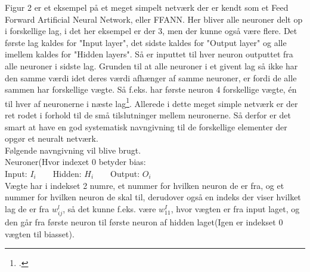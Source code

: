 Figur 2 er et eksempel på et meget simpelt netværk der er kendt som et Feed Forward Artificial Neural Network, eller FFANN.
Her bliver alle neuroner delt op i forskellige lag, i det her eksempel er der 3, men der kunne også være flere. Det første lag
kaldes for "Input layer", det sidste kaldes for "Output layer" og alle imellem kaldes for "Hidden layers". Så er inputtet
til hver neuron outputtet fra alle neuroner i sidste lag. Grunden til at alle neuroner i et givent lag så ikke har den samme værdi
idet deres værdi afhænger af samme neuroner, er fordi de alle sammen har forskellige vægte. Så f.eks. har første neuron 4 forskellige vægte,
én til hver af neuronerne i næste lag\footcite{ANN11}. Allerede i dette meget simple netværk er der ret rodet i forhold til de små tilslutninger mellem neuronerne.
Så derfor er det smart at have en god systematisk navngivning til de forskellige elementer der opgør et neuralt netværk.\\
Følgende navngivning vil blive brugt.\\
Neuroner(Hvor indexet 0 betyder bias:\\
Input: $I_{i}$~~~~Hidden: $H_{i}$~~~~Output: $O_{i}$ \\
Vægte har i indekset 2 numre, et nummer for hvilken neuron de er fra, og et nummer for hvilken neuron de skal til, derudover også  en indeks der viser hvilket lag de er fra
$w_{ij}^{l}$, så det kunne f.eks. være $w_{11}^I$, hvor vægten er fra input laget, og den går fra første neuron til første neuron af hidden laget(Igen er indekset 0 vægten til
biasset).
